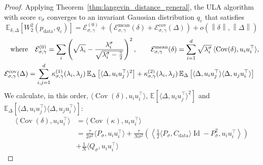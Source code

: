 \documentclass[11pt]{article}
\newcommand{\norm}[1]{\left\|{#1}\right\|}
\newcommand{\id}{\operatorname{Id}}
\newcommand{\EE}{\mathbb{E}}
\newcommand{\cov}{\operatorname{Cov}}
\begin{document}
\begin{proof}
Applying Theorem~\ref{thm:langevin_distance_general}, the ULA algorithm with score $v_\sigma$ converges to an invariant Gaussian distribution $q_\varepsilon$ that satisfies
\begin{equation} \label{eq:292}
\EE_{\delta, \Delta}  \left[ W_2^2(p_\mathrm{data},q_\varepsilon) \right] =  \mathcal{E}^{(0)}_{\sigma, \gamma} + \left( \mathcal{E}_{\sigma, \gamma}^{\text{mean}}(\delta) + \mathcal{E}_{\sigma, \gamma}^{\text{cov}}(\Delta) \right) + o\left(\norm{\delta}, \norm{\Delta}\right)
\end{equation}
\begin{equation} 
\begin{split}
\text{where} &\quad 
\mathcal{E}^{(0)}_{\sigma, \gamma} = \sum_i \left(\sqrt{\lambda_i} - \frac{\lambda_i^\sigma}{\sqrt{\lambda_i^\sigma - \frac{\gamma}{2}}}\right)^2, \qquad
\mathcal{E}_{\sigma, \gamma}^{\text{mean}}(\delta) = \sum_{i=1}^d \sqrt{\lambda^\sigma_i } \, \langle \cov(\delta), u_i u_i^\top \rangle, \label{eq:eps_0_bis} \\ \vspace{-0.2cm}
\mathcal{E}_{\sigma, \gamma}^{\text{cov}}(\Delta) &= \sum_{i,j=1}^d \kappa^{(1)}_{\sigma, \gamma}(\lambda_i, \lambda_j) \, \EE_{\Delta}\left[\langle \Delta, u_iu_j^\top \rangle^2\right] + \kappa^{(2)}_{\sigma, \gamma}(\lambda_i, \lambda_j) \, \EE_{\Delta}\left[\langle \Delta, u_iu_j^\top \rangle \langle \Delta, u_ju_i^\top \rangle \right] 
\end{split}
\end{equation}
We calculate, in this order, $\langle \cov(\delta), u_i u_i^\top \rangle $, $\EE[\langle \Delta, u_i u_j^\top \rangle ^2]$ and $\EE_{\Delta}\left[ \langle \Delta, u_i u_j^\top \rangle \langle \Delta, u_j u_i^\top \rangle \right]$:
\begin{align*}
    \langle \cov(\delta), u_i u_i^\top \rangle &=  \langle \cov(\kappa), u_i u_i^\top \rangle \\
    &= \frac{\tau}{2\sigma^2} \langle P_\sigma, u_i u_i^\top \rangle 
    +  \frac{\tau}{N \sigma^2} \left( 
    \left\langle \frac12 \langle P_\sigma, C_\mathrm{data} \rangle \id -  P_\sigma^2, u_i u_i^\top \right\rangle \right) \\ \nonumber
    &+ \frac{1}{N} \langle Q_\sigma, u_i u_i^\top \rangle %

\end{align*}
\end{proof}
\end{document}
